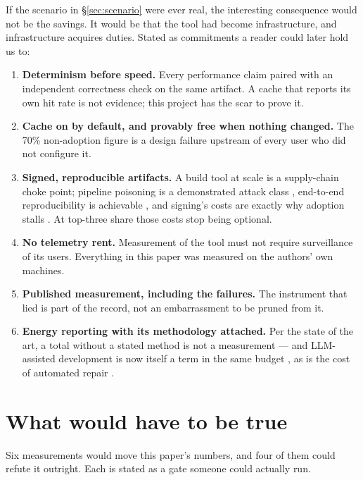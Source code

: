 \documentclass[11pt,a4paper]{article}
\providecommand{\textcite}[1]{\cite{#1}}
\begin{document}
If the scenario in \S\ref{sec:scenario} were ever real, the interesting consequence would not be the savings. It would be that the tool had become infrastructure, and infrastructure acquires duties. Stated as commitments a reader could later hold us to:


\begin{enumerate}[leftmargin=1.5em,itemsep=3pt]
\item \textbf{Determinism before speed.} Every performance claim paired with an independent correctness check on the same artifact. A cache that reports its own hit rate is not evidence; this project has the scar to prove it.
\item \textbf{Cache on by default, and provably free when nothing changed.} The 70\% non-adoption figure is a design failure upstream of every user who did not configure it.
\item \textbf{Signed, reproducible artifacts.} A build tool at scale is a supply-chain choke point; pipeline poisoning is a demonstrated attack class \textcite{arxiv2601_08995}, end-to-end reproducibility is achievable \textcite{arxiv2206_14606}, and signing's costs are exactly why adoption stalls \textcite{arxiv2510_04964,arxiv2409_05014}. At top-three share those costs stop being optional.
\item \textbf{No telemetry rent.} Measurement of the tool must not require surveillance of its users. Everything in this paper was measured on the authors' own machines.
\item \textbf{Published measurement, including the failures.} The instrument that lied is part of the record, not an embarrassment to be pruned from it.
\item \textbf{Energy reporting with its methodology attached.} Per the state of the art, a total without a stated method is not a measurement \textcite{arxiv2506_09683,arxiv2407_11611} --- and LLM-assisted development is now itself a term in the same budget \textcite{arxiv2505_04521}, as is the cost of automated repair \textcite{arxiv2211_12104}.
\end{enumerate}


\section{What would have to be true}\label{sec:falsify}


Six measurements would move this paper's numbers, and four of them could refute it outright. Each is stated as a gate someone could actually run.
\end{document}
